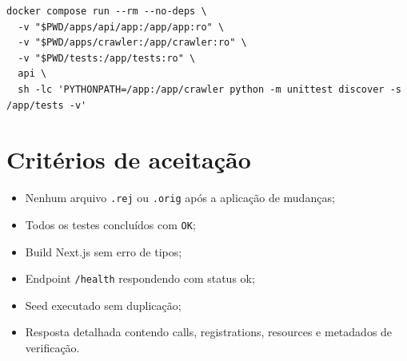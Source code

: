 \begin{lstlisting}
docker compose run --rm --no-deps \
  -v "$PWD/apps/api/app:/app/app:ro" \
  -v "$PWD/apps/crawler:/app/crawler:ro" \
  -v "$PWD/tests:/app/tests:ro" \
  api \
  sh -lc 'PYTHONPATH=/app:/app/crawler python -m unittest discover -s /app/tests -v'
\end{lstlisting}

\section{Critérios de aceitação}

\begin{itemize}[leftmargin=*,itemsep=0.25em]
\item Nenhum arquivo \texttt{.rej} ou \texttt{.orig} após a aplicação de mudanças;
\item Todos os testes concluídos com \texttt{OK};
\item Build Next.js sem erro de tipos;
\item Endpoint \texttt{/health} respondendo com status ok;
\item Seed executado sem duplicação;
\item Resposta detalhada contendo calls, registrations, resources e metadados de verificação.
\end{itemize}
